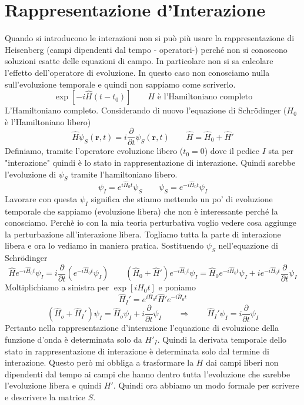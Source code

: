 \section{Rappresentazione d'Interazione}
Quando si introducono le interazioni non si può più usare la rappresentazione di Heisenberg (campi dipendenti dal tempo - operatori-) perché non si conoscono soluzioni esatte delle equazioni di campo. In particolare non si sa calcolare l'effetto dell'operatore di evoluzione. In questo caso non conosciamo nulla sull'evoluzione temporale e quindi non sappiamo come scriverlo.
$$
\exp[-i\hat{H}(t - t_0)] \qquad H \text{ è l'Hamiltoniano completo}
$$
L'Hamiltoniano completo. Considerando di nuovo l'equazione di Schr\"odinger ($H_0$ è l'Hamiltoniano libero)
$$
\hat{H}\psi_S(\mathbf{r}, t) = i\frac{\partial}{\partial t}\psi_S(\mathbf{r}, t) \qquad \hat{H} = \hat{H}_0 + \hat{H}'
$$
Definiamo, tramite l'operatore evoluzione libero ($t_0=0$) dove il pedice $I$ sta per "interazione" quindi è lo stato in rappresentazione di interazione. Quindi sarebbe l'evoluzione di $\psi_S$ tramite l'hamiltoniano libero.
$$
\psi_I = e^{i\hat{H}_0 t}\psi_S \qquad \psi_S = e^{-i\hat{H}_0 t}\psi_I
$$
Lavorare con questa $\psi_I$ significa che stiamo mettendo un po' di evoluzione temporale che sappiamo (evoluzione libera) che non è interessante perché la conosciamo. Perchè io con la mia teoria perturbativa voglio vedere cosa aggiunge la perturbazione all'interazione libera. Togliamo tutta la parte di interazione libera e ora lo vediamo in maniera pratica. Sostituendo $\psi_S$ nell'equazione di Schr\"odinger
$$
\hat{H}e^{-i\hat{H}_0 t}\psi_I = i\frac{\partial}{\partial t}(e^{-i\hat{H}_0 t}\psi_I) \qquad(\hat{H}_0 + \hat{H}')e^{-i\hat{H}_0 t}\psi_I = \hat{H}_0 e^{-i\hat{H}_0 t}\psi_I + i e^{-i\hat{H}_0 t}\frac{\partial}{\partial t}\psi_I
$$
Moltiplichiamo a sinistra per $\exp{[iH_0t]}$ e poniamo
$$
\hat{H}_I' = e^{i\hat{H}_0 t} \hat{H}' e^{-i\hat{H}_0 t}
$$
$$
(\hat{H}_o + \hat{H}_I')\psi_I = \hat{H}_o \psi_I + i\frac{\partial}{\partial t}\psi_I \qquad \Longrightarrow \qquad \hat{H}_I'\psi_I = i\frac{\partial}{\partial t}\psi_I
$$
Pertanto nella rappresentazione d'interazione l'equazione di evoluzione della funzione d'onda è determinata solo da $H'_I$. Quindi la derivata temporale dello stato in rappresentazione di interazione è determinata solo dal termine di interazione. Questo però mi obbliga a trasformare la $H$ dai campi liberi non dipendenti dal tempo ai campi che hanno dentro tutta l'evoluzione che sarebbe l'evoluzione libera e quindi $H'$. Quindi ora abbiamo un modo formale per scrivere e descrivere la matrice $S$.
